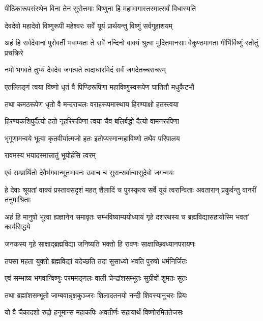 \twolineshloka
{पीठिकारूपसंस्थेन विना तेन सुरोत्तमाः}
{विष्णुना हि महाभागास्तस्मात्सर्वं विधास्यति}%

\twolineshloka
{देवदेवो महादेवो विष्णुरूपी महेश्वरः}
{सर्वे यूयं प्रार्थयन्तु विष्णुं सर्वगुहाशयम्}%

\threelineshloka
{अहं हि सर्वदेवानां पुरोवर्ती भवाम्यतः}
{ते सर्वे नन्दिनो वाक्यं श्रुत्वा मुदितमानसाः}
{वैकुण्ठमागता गीर्भिर्विष्णुं स्तोतुं प्रचक्रिरे}%


\twolineshloka
{नमो भगवते तुभ्यं देवदेव जगत्पते}
{त्वदाधारमिदं सर्वं जगदेतच्चराचरम्}%

\twolineshloka
{एतल्लिङ्गं त्वया विष्णो धृतं वै पिण्डिरूपिणा}
{महाविष्णुस्वरूपेण घातितौ मधुकैटभौ}%

\twolineshloka
{तथा कमठरूपेण धृतो वै मन्दराचलः}
{वराहरूपमास्थाय हिरण्याक्षो हतस्त्वया}%

\twolineshloka
{हिरण्यकशिपुर्दैत्यो हतो नृहरिरूपिणा}
{त्वया चैव बलिर्बद्धो दैत्यो वामनरूपिणा}%

\twolineshloka
{भृगूणामन्वये भूत्वा कृतवीर्यात्मजो हतः}
{इतोप्यस्मान्महाविष्णो तथैव परिपालय}%

\onelineshloka
{रावमस्य भयादस्मात्त्रातुं भूयोर्हसि त्वरम्}%

\twolineshloka
{एवं सम्प्रार्थितो देवैर्भगवान्भूतभावनः}
{उवाच च सुरान्सर्वान्वासुदेवो जगन्मयः}%

\threelineshloka
{हे देवाः श्रूयतां वाक्यं प्रस्तावसदृशं महत्}
{शैलादिं च पुरस्कृत्य सर्वे यूयं त्वरान्विताः}
{अवतारान् प्रकुर्वन्तु वानरीं तनुमाश्रिताः}%

\threelineshloka
{अहं हि मानुषो भूत्वा ह्यज्ञानेन समावृतः}
{सम्भविष्याम्ययोध्यायं गृहे दशरथस्य च}
{ब्रह्मविद्यासहायोस्मि भवतां कार्यसिद्धये}%

\twolineshloka
{जनकस्य गृहे साक्षाद्ब्रह्मविद्या जनिष्यति}
{भक्तो हि रावणः साक्षाच्छिवध्यानपरायणः}%

\twolineshloka
{तपसा महता युक्तो ब्रह्मविद्यां यदेच्छति}
{तदा सुसाध्यो भवति पुरुषो धर्मनिर्जितः}%

\twolineshloka
{एवं सम्भाष्य भगवान्विष्णुः परममङ्गलः}
{वाली चेन्द्रांशसम्भूतः सुग्रीवों शुमतः सुतः}%

\twolineshloka
{तथा ब्रह्मांशसम्भूतो जाम्बवान्नृक्षकुञ्जरः}
{शिलादतनयो नन्दी शिवस्यानुचरः प्रियः}%

\twolineshloka
{यो वै चैकादशो रुद्रो हनूमान्स महाकपिः}
{अवतीर्णः सहायार्थं विष्णोरमिततेजसः}%

